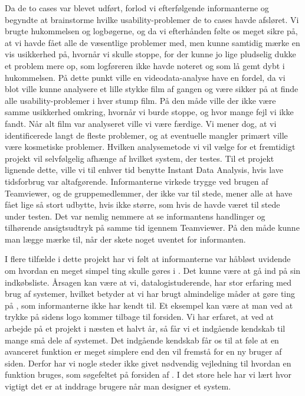 Da de to cases var blevet udført, forlod vi efterfølgende informanterne og begyndte at brainstorme hvilke usability-problemer de to cases havde afsløret. Vi brugte hukommelsen og logbøgerne, og da vi efterhånden følte os meget sikre på, at vi havde fået alle de væsentlige problemer med, men kunne samtidig mærke en vis usikkerhed på, hvornår vi skulle stoppe, for der kunne jo lige pludselig dukke et problem mere op, som logføreren ikke havde noteret og som lå gemt dybt i hukommelsen. På dette punkt ville en videodata-analyse have en fordel, da vi blot ville kunne analysere et lille stykke film af gangen og være sikker på at finde alle usability-problemer i hver stump film. På den måde ville der ikke være samme usikkerhed omkring, hvornår vi burde stoppe, og hvor mange fejl vi ikke fandt. Når alt film var analyseret ville vi være færdige. Vi mener dog, at vi identificerede langt de fleste problemer, og at eventuelle mangler primært ville være kosmetiske problemer. Hvilken analysemetode vi vil vælge for et fremtidigt projekt vil selvfølgelig afhænge af hvilket system, der testes. Til et projekt lignende dette, ville vi til enhver tid benytte Instant Data Analysis, hvis lave tidsforbrug var altafgørende.
Informanterne virkede trygge ved brugen af Teamviewer, og de gruppemedlemmer, der ikke var til stede, mener alle at have fået lige så stort udbytte, hvis ikke større, som hvis de havde været til stede under testen. Det var nemlig nemmere at se informantens handlinger og tilhørende ansigtsudtryk på samme tid igennem Teamviewer. På den måde kunne man lægge mærke til, når der skete noget uventet for informanten.

I flere tilfælde i dette projekt har vi følt at informanterne var håbløst uvidende om hvordan en meget simpel ting skulle gøres i \Foodl. Det kunne \fx være at gå ind på sin indkøbsliste. Årsagen kan være at vi, datalogistuderende, har stor erfaring med brug af systemer, hvilket betyder at vi har brugt almindelige måder at gøre ting på \Foodl{}, som informanterne ikke har kendt til. Et eksempel kan være at man ved at trykke på sidens logo kommer tilbage til forsiden.
Vi har erfaret, at ved at arbejde på et projekt i næsten et halvt år, så får vi et indgående kendskab til mange små dele af systemet. Det indgående kendskab får os til at føle at en avanceret funktion er meget simplere end den vil fremstå for en ny bruger af siden. Derfor har vi nogle steder ikke givet nødvendig vejledning til hvordan en funktion bruges, som \fx søgefeltet på forsiden af \Foodl. I det store hele har vi lært hvor vigtigt det er at inddrage brugere når man designer et system.



